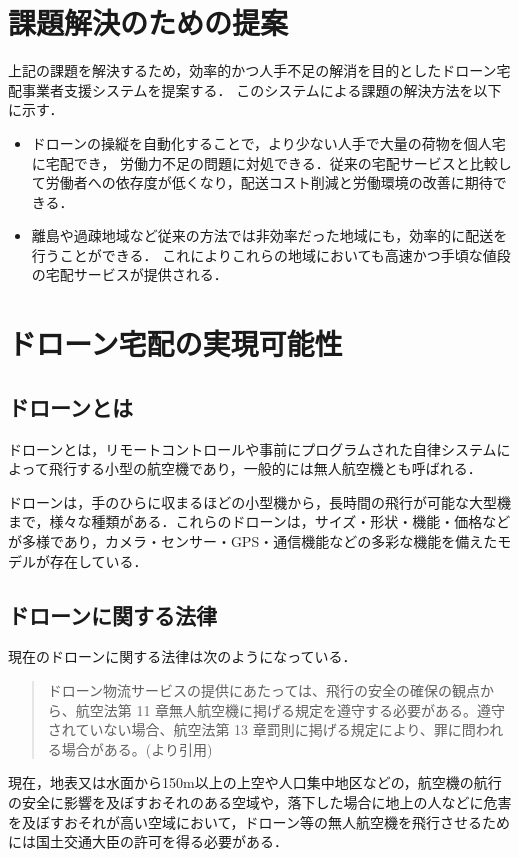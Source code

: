 \documentclass[a4paper, titlepage]{jsarticle}
\begin{document}
\section{課題解決のための提案}
上記の課題を解決するため，効率的かつ人手不足の解消を目的としたドローン宅配事業者支援システムを提案する．
このシステムによる課題の解決方法を以下に示す．
\begin{itemize}
  \item ドローンの操縦を自動化することで，より少ない人手で大量の荷物を個人宅に宅配でき，
        労働力不足の問題に対処できる．従来の宅配サービスと比較して労働者への依存度が低くなり，配送コスト削減と労働環境の改善に期待できる．
  \item 離島や過疎地域など従来の方法では非効率だった地域にも，効率的に配送を行うことができる．
        これによりこれらの地域においても高速かつ手頃な値段の宅配サービスが提供される．
\end{itemize}

\section{ドローン宅配の実現可能性}
\subsection{ドローンとは}
ドローンとは，リモートコントロールや事前にプログラムされた自律システムによって飛行する小型の航空機であり，一般的には無人航空機とも呼ばれる．

ドローンは，手のひらに収まるほどの小型機から，長時間の飛行が可能な大型機まで，様々な種類がある．これらのドローンは，サイズ・形状・機能・価格などが多様であり，カメラ・センサー・GPS・通信機能などの多彩な機能を備えたモデルが存在している．

\subsection{ドローンに関する法律}
現在のドローンに関する法律は次のようになっている．
\begin{quote}
  ドローン物流サービスの提供にあたっては、飛行の安全の確保の観点から、航空法第 11 章無人航空機に掲げる規定を遵守する必要がある。遵守されていない場合、航空法第 13 章罰則に掲げる規定により、罪に問われる場合がある。(\cite{delivery_guidelines_2023}より引用)
\end{quote}

現在，地表又は水面から150m以上の上空や人口集中地区などの，航空機の航行の安全に影響を及ぼすおそれのある空域や，落下した場合に地上の人などに危害を及ぼすおそれが高い空域において，ドローン等の無人航空機を飛行させるためには国土交通大臣の許可を得る必要がある．
\end{document}
